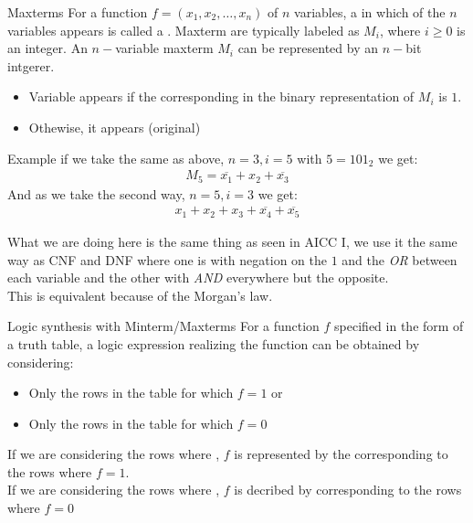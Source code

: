\begin{parag}{Maxterms}
    For a function $f = (x_1, x_2, \dots, x_n)$ of $n$ variables, a 
 in which  of the $n$ variables appears  is called a . Maxterm are typically labeled as $M_i$, where $i \geq 0$ is an integer. An $n-$variable maxterm $M_i$ can be represented by an $n-$bit intgerer.
 \begin{itemize}
     \item Variable appears  if the corresponding  in the binary representation of $M_i$ is $1$.
     \item Othewise, it appears  (original)
 \end{itemize}
 \begin{subparag}{Example}
     if we take the same as above, $n = 3, i = 5$ with $5 = 101_2$ we get:
     \begin{align*}
         M_5 = \overline{x_1} + x_2 + \overline{x_3}
     \end{align*}
     And as we take the second way, $n=5, i = 3$ we get:
     \begin{align*}
         x_1 + x_2 + x_3 + \overline{x_4} + \overline{x_5}
     \end{align*}
 \end{subparag}
 \begin{framedremark}
     What we are doing here is the same thing as seen in AICC I, we use it the same way as CNF and DNF where one is with negation on the  $1$ and the \textit{OR} between each variable and the other with \textit{AND} everywhere but the opposite.
     \\
     This is equivalent because of the Morgan's law.
 \end{framedremark}
 
\end{parag}  


\begin{parag}{Logic synthesis with Minterm/Maxterms}
    For a function $f$ specified in the form of a truth table, a logic expression realizing the function can be obtained by considering:
    \begin{itemize}
        \item Only the rows in the table for which $f = 1$ or
        \item Only the rows in the table for which $f = 0$
    \end{itemize}

    If we are considering the rows where , $f$ is represented by the  corresponding to the rows where $f = 1$. \\
If we are considering the rows where , $f$ is decribed by  corresponding to the rows where $f = 0$
\end{parag}

